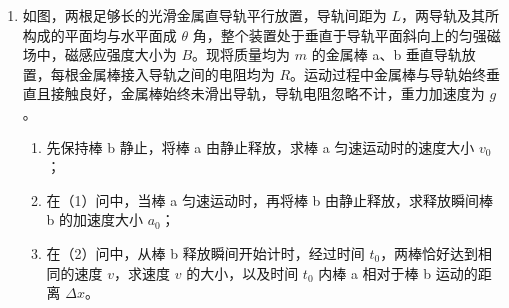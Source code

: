 \documentclass[\gkver]{gaokaozhenti}
\begin{document}
\begin{enumerate}
{\begin{enumerate}
	\item
	$\Delta F$ = [1 - ($\frac{{{V_0}}}{{{V_0} + {V_1}}}$)$^{n}$]$p_{0}S$

\end{enumerate}
}

\item
如图，两根足够长的光滑金属直导轨平行放置，导轨间距为 $L$，两导轨及其所构成的平面均与水平面成 $\theta$ 角，整个装置处于垂直于导轨平面斜向上的匀强磁场中，磁感应强度大小为 $B$。现将质量均为 $m$ 的金属棒 a、b 垂直导轨放置，每根金属棒接入导轨之间的电阻均为 $R$。运动过程中金属棒与导轨始终垂直且接触良好，金属棒始终未滑出导轨，导轨电阻忽略不计，重力加速度为 $g$。
\begin{enumerate}
	\item
	先保持棒 b 静止，将棒 a 由静止释放，求棒 a 匀速运动时的速度大小 $v_{0}$；
	\item
	在（1）问中，当棒 a 匀速运动时，再将棒 b 由静止释放，求释放瞬间棒 b 的加速度大小 $a_{0}$；
	\item
	在（2）问中，从棒 b 释放瞬间开始计时，经过时间 $t_{0}$，两棒恰好达到相同的速度 $v$，求速度 $v$ 的大小，以及时间 $t_{0}$ 内棒 a 相对于棒 b 运动的距离 $\Delta x$。
\end{enumerate}


\end{enumerate}
\end{document}
